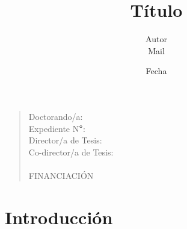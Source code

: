 \documentclass[a4paper, 12pt, twoside]{article} %
\title{Título}
\date{Fecha}
\author{Autor \\ Mail \\}
\begin{document}
\maketitle

\begin{quote}
Doctorando/a: \\
Expediente N$\degree$: \\
Director/a de Tesis: \\
Co-director/a de Tesis: \\
\\
FINANCIACIÓN
\end{quote}

\section{Introducción}

\cite{Abney:1987nounphrase}



%
%


\end{document}
